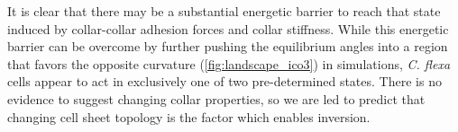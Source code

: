 It is clear that there may be a substantial energetic barrier to reach that state induced by collar-collar adhesion forces and collar stiffness. 
While this energetic barrier can be overcome by further pushing the equilibrium angles into a region that favors the opposite curvature (\cref{fig:landscape_ico3}) in simulations, \textit{C. flexa} cells appear to act in exclusively one of two pre-determined states.
There is no evidence to suggest changing collar properties, so we are led to predict that changing cell sheet topology is the factor which enables inversion.

